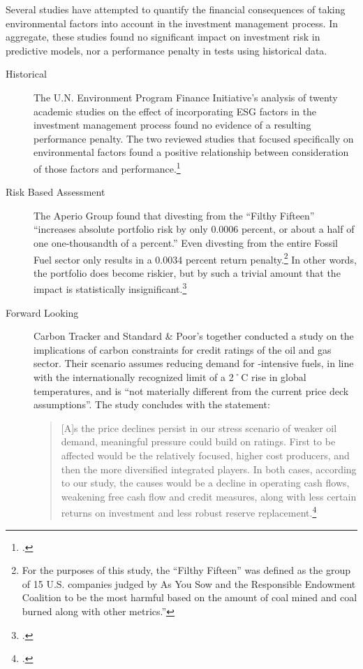 \documentclass[10pt]{article}
\begin{document}
Several studies have attempted to quantify the financial consequences of taking environmental factors into account in the investment management process.
In aggregate, these studies found no significant impact on investment risk in predictive models, nor a performance penalty in tests using historical data.
\begin{description}
  \item[Historical] The U.N. Environment Program Finance Initiative's analysis of twenty academic studies on the effect of incorporating ESG factors in the investment management process found no evidence of a resulting performance penalty. The two reviewed studies that focused specifically on environmental factors found a positive relationship between consideration of those factors and performance.\footcite{UNEPFI2007}
  \item[Risk Based Assessment] The Aperio Group found that divesting from the ``Filthy Fifteen'' ``increases absolute portfolio risk by only 0.0006 percent, or about a half of one one-thousandth of a percent.'' Even divesting from the entire Fossil Fuel sector only results in a 0.0034 percent return penalty.\footnote{For the purposes of this study, the ``Filthy Fifteen'' was defined as the group of 15 U.S. companies judged by As You Sow and the Responsible Endowment Coalition to be the most harmful based on the amount of coal mined and coal burned along with other metrics.''} In other words, the portfolio does become riskier, but by such a trivial amount that the impact is statistically insignificant.\footcite{Aperio2013}
  \item[Forward Looking] Carbon Tracker and Standard \& Poor's together conducted a study on the implications of carbon constraints for credit ratings of the oil and gas sector. Their scenario assumes reducing demand for -intensive fuels, in line with the internationally recognized limit of a 2˚C rise in global temperatures, and is ``not materially different from the current price deck assumptions''. The study concludes with the statement:
\begin{quote} 
[A]s the price declines persist in our stress scenario of weaker oil demand, meaningful pressure could build on ratings. First to be affected would be the relatively focused, higher cost producers, and then the more diversified integrated players. In both cases, according to our study, the causes would be a decline in operating cash flows, weakening free cash flow and credit measures, along with less certain returns on investment and less robust reserve replacement.\footcite{SandPConstrained}

\end{quote}
\end{description}
\end{document}
